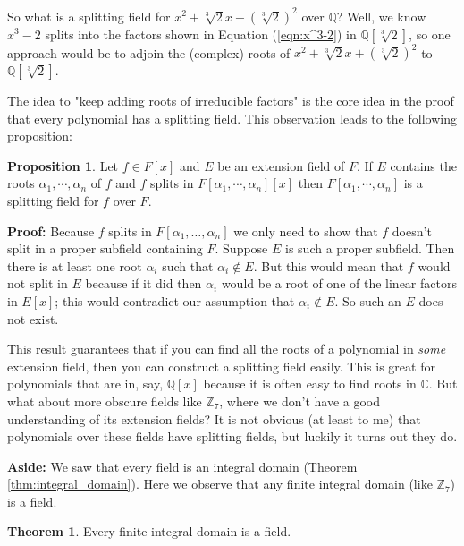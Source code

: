 \documentclass[11pt, oneside]{article}   	%
\theoremstyle{definition}
\newtheorem{thm}{Theorem}[section]
\newtheorem{proposition}{Proposition}[section]
\begin{document}
\bigskip
\noindent
So what is a splitting field for $x^2 + \sqrt[3]{2} x +
(\sqrt[3]{2})^2$ over $\mathbb{Q}$? Well, we know $x^3-2$ splits
into the factors shown in Equation (\ref{eqn:x^3-2}) in
$\mathbb{Q}[\sqrt[3]{2}]$, so one approach would be to adjoin the
(complex) roots of $x^2 + \sqrt[3]{2} x + (\sqrt[3]{2})^2$ to
$\mathbb{Q}[\sqrt[3]{2}]$.

\bigskip
\noindent
The idea to "keep adding roots of irreducible factors" is the
core idea in the proof that every polynomial has a splitting
field. This observation leads to the following proposition:

\bigskip
\begin{proposition}
Let $f \in F[x]$ and $E$ be an extension field of $F$. If $E$
contains the roots $\alpha_1, \cdots, \alpha_n$ of $f$ and $f$
splits in $F[\alpha_1, \cdots, \alpha_n][x]$ then $F[\alpha_1,
\cdots, \alpha_n]$ is a splitting field for $f$ over $F$.
\end{proposition}

\noindent
\textbf{Proof: } Because $f$ splits in $F[\alpha_1, \hdots,
\alpha_n]$ we only need to show that $f$ doesn't split in a
proper subfield containing $F$. Suppose $E$ is such a proper
subfield.  Then there is at least one root $\alpha_i$ such that
$\alpha_i \notin E$. But this would mean that $f$ would not split
in $E$ because if it did then $\alpha_i$ would be a root of one
of the linear factors in $E[x]$; this would contradict our
assumption that $\alpha_i \notin E$. So such an $E$ does not
exist.

\bigskip
\noindent
This result guarantees that if you can find all the roots of a
polynomial in \emph{some} extension field, then you can construct
a splitting field easily.  This is great for polynomials that are
in, say, $\mathbb{Q}[x]$ because it is often easy to find roots
in $\mathbb{C}$. But what about more obscure fields like
$\mathbb{Z}_7$, where we don't have a good understanding of its
extension fields? It is not obvious (at least to me) that
polynomials over these fields have splitting fields, but luckily
it turns out they do.

\bigskip
\noindent
\textbf{Aside: } We saw that every field is an integral domain
(Theorem \ref{thm:integral_domain}). Here we observe that any
finite integral domain (like $\mathbb{Z}_7$) is a field.

\bigskip
\begin{thm}
Every finite integral domain is a field.
\label{thm:finite_id_is_a_field}
\end{thm}
\end{document}
